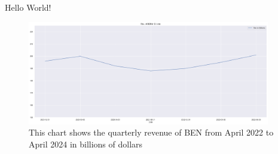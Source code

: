 \documentclass{article}
\begin{document}
  Hello World! 

  \begin{figure}
  \centering
  \includegraphics[width=400px]{images/RevInBillions.png}
  \caption{\label{fig:RevInBillions}This chart shows the quarterly revenue of BEN from April 2022 to April 2024 in billions of dollars}
  \end{figure}
\end{document}
